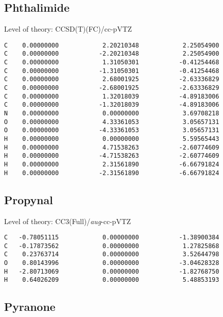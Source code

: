\documentclass[journal=jctcce,manuscript=article,layout=traditional]{achemso}
\newcommand{\TZ}{cc-pVTZ}
\newcommand{\AVTZ}{\emph{aug}-cc-pVTZ}
\begin{document}
\subsection*{Phthalimide}

\begin{singlespace}
Level of theory: CCSD(T)(FC)/{\TZ}
\begin{verbatim}
C    0.00000000            2.20210348            2.25054900
C    0.00000000           -2.20210348            2.25054900
C    0.00000000            1.31050301           -0.41254468
C    0.00000000           -1.31050301           -0.41254468
C    0.00000000            2.68001925           -2.63336829
C    0.00000000           -2.68001925           -2.63336829
C    0.00000000            1.32018039           -4.89183006
C    0.00000000           -1.32018039           -4.89183006
N    0.00000000            0.00000000            3.69708218
O    0.00000000            4.33361053            3.05657131
O    0.00000000           -4.33361053            3.05657131
H    0.00000000            0.00000000            5.59565443
H    0.00000000            4.71538263           -2.60774609
H    0.00000000           -4.71538263           -2.60774609
H    0.00000000            2.31561890           -6.66791824
H    0.00000000           -2.31561890           -6.66791824
\end{verbatim}
\end{singlespace}

\subsection*{Propynal}

\begin{singlespace}
Level of theory: CC3(Full)/{\AVTZ}
\begin{verbatim}
C   -0.78051115            0.00000000           -1.38900384
C   -0.17873562            0.00000000            1.27825868
C    0.23763714            0.00000000            3.52644798
O    0.80143996            0.00000000           -3.04628328
H   -2.80713069            0.00000000           -1.82768750
H    0.64026209            0.00000000            5.48853193
\end{verbatim}
\end{singlespace}

\subsection*{Pyranone}
\end{document}
